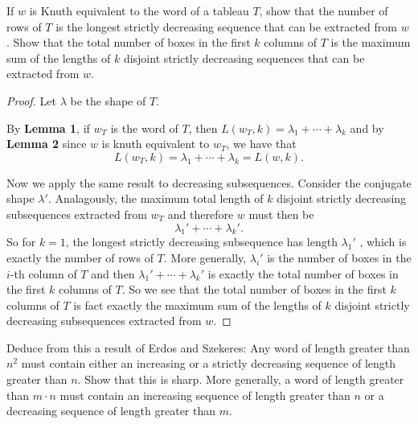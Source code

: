 \documentclass[addpoints,10pt]{exam}
\theoremstyle{plain}
\theoremstyle{definition}
\newtheorem{prob}[thm]{Problem}
\theoremstyle{plain}
\theoremstyle{plain}
\theoremstyle{definition}
\let\oldprob\prob
\let\endoldprob\endprob
\renewenvironment{prob}
  {\begin{singlespace}\oldprob}
  {\endoldprob\end{singlespace}}
\begin{document}
\newpage
\setcounter{thm}{0}
\renewcommand{\thethm}{3.\arabic{thm}}

\begin{prob}
If $w$ is Knuth equivalent to the word of a tableau $T$, show that the number of rows of $T$ is the longest strictly decreasing sequence that can be extracted from $w$. Show that the total number of boxes in the first $k$ columns of $T$ is the maximum sum of the lengths of $k$ disjoint strictly decreasing sequences that can be extracted from $w$.
\end{prob}

\begin{proof}
Let $\lambda$ be the shape of $T$.

By \textbf{Lemma 1}, if \(w_T\) is the word of \(T\), then $L(w_T,k)=\lambda_1+\cdots+\lambda_k$ and by \textbf{Lemma 2} since $w$ is knuth equivalent to $w_{T}$, we have that
$$L(w_T,k)=\lambda_1+\cdots+\lambda_k=L(w,k).$$

Now we apply the same result to decreasing subsequences. Consider the conjugate shape $\lambda'$. Analagously, the maximum total length of \(k\) disjoint strictly
decreasing subsequences extracted from \(w_{T}\) and therefore $w$ must then be
\[
\lambda_1'+\cdots+\lambda_k'.
\]
So for $k=1$, the longest strictly decreasing subsequence has length $\lambda_1'$
, which is exactly the number of rows of \(T\). More generally, \(\lambda_i'\) is the number of boxes in the \(i\)-th column of
\(T\) and then $\lambda_1'+\cdots+\lambda_k'$ is exactly the total number of boxes in the first \(k\) columns of \(T\). So we see that the total number of boxes in the first \(k\) columns of \(T\) is fact exactly the maximum sum of the lengths of \(k\) disjoint strictly decreasing subsequences extracted from \(w\).

\end{proof}

\newpage
\setcounter{thm}{1}
\renewcommand{\thethm}{3.\arabic{thm}}

\begin{prob}
Deduce from this a result of Erdos and Szekeres: Any word of length greater than $n^{2}$ must contain either an increasing or a strictly decreasing sequence of length greater than $n$. Show that this is sharp. More generally, a word of length greater than $m\cdot n$ must contain an increasing sequence of length greater than $n$ or a decreasing sequence of length greater than $m$.
\end{prob}
\end{document}
